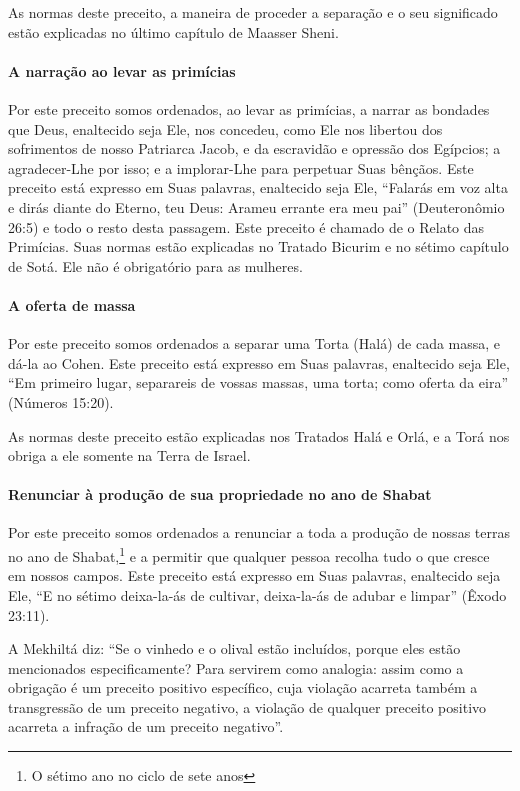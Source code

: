 As normas deste preceito, a maneira de proceder a separação e o seu
significado estão explicadas no último capítulo de Maasser Sheni.


\paragraph{A narração ao levar as primícias}

Por este preceito somos ordenados, ao levar as primícias, a narrar as
bondades que Deus, enaltecido seja Ele, nos concedeu, como Ele nos
libertou dos sofrimentos de nosso Patriarca Jacob, e da escravidão e
opressão dos Egípcios; a agradecer-Lhe por isso; e a implorar-Lhe para
perpetuar Suas bênçãos. Este preceito está expresso em Suas palavras,
enaltecido seja Ele, ``Falarás em voz alta e dirás diante do Eterno, teu
Deus: Arameu errante era meu pai'' (Deuteronômio 26:5) e todo o resto
desta passagem. Este preceito é chamado de o Relato das Primícias. Suas
normas estão explicadas no Tratado Bicurim e no sétimo capítulo de Sotá.
Ele não é obrigatório para as mulheres.

\paragraph{A oferta de massa}

Por este preceito somos ordenados a separar uma Torta (Halá) de cada
massa, e dá-la ao Cohen. Este preceito está expresso em Suas
palavras, enaltecido seja Ele, ``Em primeiro lugar, separareis de vossas
massas, uma torta; como oferta da eira'' (Números 15:20).

As normas deste preceito estão explicadas nos Tratados Halá e Orlá, e a
Torá nos obriga a ele somente na Terra de Israel.

\paragraph{Renunciar à produção de sua propriedade no ano de Shabat}

Por este preceito somos ordenados a renunciar a toda a produção de
nossas terras no ano de Shabat,\footnote{O sétimo ano no ciclo de sete anos} e a permitir que
qualquer pessoa recolha tudo o que cresce em nossos campos. Este
preceito está expresso em Suas palavras, enaltecido seja Ele, ``E no
sétimo deixa-la-ás de cultivar, deixa-la-ás de adubar e limpar'' (Êxodo
23:11).

A Mekhiltá diz: ``Se o vinhedo e o olival estão incluídos, porque eles
estão mencionados especificamente? Para servirem como analogia: assim
como a obrigação é um preceito positivo específico, cuja violação
acarreta também a transgressão de um preceito negativo, a violação de
qualquer preceito positivo acarreta a infração de um preceito
negativo''.

